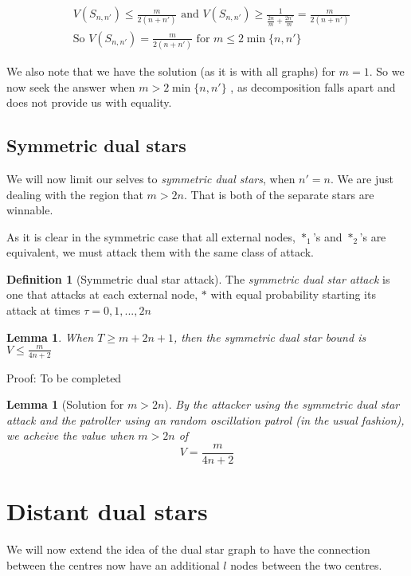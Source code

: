 \documentclass[a4paper,10pt]{article}
\newtheorem{lemma}[theorem]{Lemma}
\theoremstyle{definition}
\newtheorem{definition}[theorem]{Definition}
\theoremstyle{definition}
\theoremstyle{remark}
\theoremstyle{definition}
\begin{document}
\begin{align*}
&V(S_{n,n'}) \leq \frac{m}{2(n+n')} \text{ and } V(S_{n,n'}) \geq \frac{1}{\frac{2n}{m}+\frac{2n'}{m}}=\frac{m}{2(n+n')} \\
&\text{So } V(S_{n,n'})=\frac{m}{2(n+n')} \text{ for } m \leq 2 \min\{n,n'\}
\end{align*}

We also note that we have the solution (as it is with all graphs) for $m=1$. So we now seek the answer when $m > 2\min\{ n,n' \}$ , as decomposition falls apart and does not provide us with equality.

\subsection{Symmetric dual stars}
We will now limit our selves to \textit{symmetric dual stars}, when $n'=n$. We are just dealing with the region that $m > 2n$. That is both of the separate stars are winnable.

As it is clear in the symmetric case that all external nodes, $*_{1}$'s and $*_{2}$'s are equivalent, we must attack them with the same class of attack.

\begin{definition}[Symmetric dual star attack]
The \textit{symmetric dual star attack} is one that attacks at each external node, $*$ with equal probability starting its attack at times $\tau=0,1,...,2n$ 
\end{definition}

\begin{lemma}
When $T \geq m+2n+1$, then the symmetric dual star bound is $V \leq \frac{m}{4n+2}$
\end{lemma}

Proof: To be completed

\begin{lemma}[Solution for $m > 2n$]
By the attacker using the symmetric dual star attack and the patroller using an random oscillation patrol (in the usual fashion), we acheive the value when $m >2n$ of
$$ V=\frac{m}{4n+2} $$
\end{lemma}

\section{Distant dual stars}
We will now extend the idea of the dual star graph to have the connection between the centres now have an additional $l$ nodes between the two centres.
\end{document}
